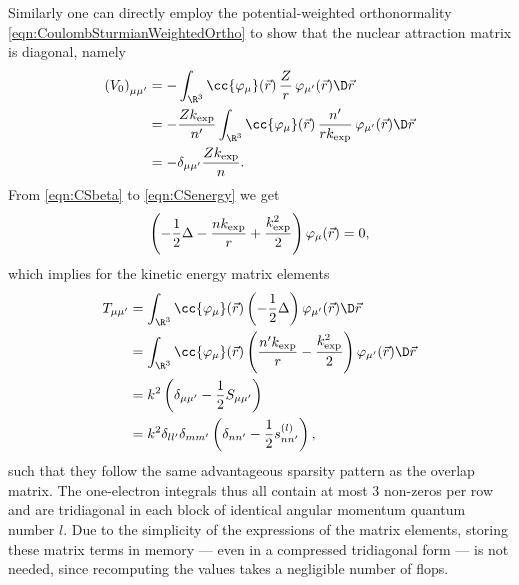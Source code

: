 Similarly one can directly employ the potential-weighted orthonormality \eqref{eqn:CoulombSturmianWeightedOrtho}
to show that the nuclear attraction matrix is diagonal, namely
\begin{equation}
	\begin{aligned}
	\left(V_0\right)_{\mu\mu'} &=
	- \int_{\R^3} \cc{\varphi_{\mu}}(\vec{r})\, \frac{Z}{r}\,
		\varphi_{\mu'}(\vec{r})  \D\vec{r} \\
	&= - \frac{Z\kexp}{n'} \int_{\R^3} \cc{\varphi_{\mu}}(\vec{r})\,
		\frac{n'}{r\kexp}\, \varphi_{\mu'}(\vec{r})  \D\vec{r} \\
	&= - \delta_{\mu \mu'} \frac{Z\kexp}{n}.
	\end{aligned}
	\label{eqn:NucAttrCS}
\end{equation}
From \eqref{eqn:CSbeta} to \eqref{eqn:CSenergy} we get
\[ \left(- \frac12 \Delta - \frac{n k_\text{exp}}{r} + \frac{k_\text{exp}^2}{2} \right) \varphi_{\mu}(\vec{r}) = 0, \]
which implies for the kinetic energy matrix elements
\begin{equation}
	\begin{aligned}
		T_{\mu\mu'} &=
		\int_{\R^3} \cc{\varphi_{\mu}}(\vec{r}) \left( - \frac12 \Delta  \right)
		\varphi_{\mu'}(\vec{r})  \D\vec{r} \\
		&= \int_{\R^3} \cc{\varphi_{\mu}}(\vec{r})
		\left(\frac{n' \kexp}{r} - \frac{\kexp^2}{2} \right)
		\varphi_{\mu'}(\vec{r})  \D\vec{r} \\
		&= k^2 \left( \delta_{\mu\mu'} - \frac12 S_{\mu\mu'} \right) \\
		&= k^2 \delta_{ll'} \delta_{mm'} \left( \delta_{nn'} - \frac{1}{2} s^{(l)}_{n n'} \right),
	\end{aligned}
	\label{eqn:KineticCS}
\end{equation}
such that they follow the same advantageous sparsity pattern as the overlap matrix.
The one-electron integrals thus all contain at most 3 non-zeros per row
and are tridiagonal in each block of identical angular momentum quantum number $l$.
Due to the simplicity of the expressions of the matrix elements,
storing these matrix terms in memory --- even in a compressed tridiagonal form ---
is not needed,
since recomputing the values takes a negligible number of flops.

